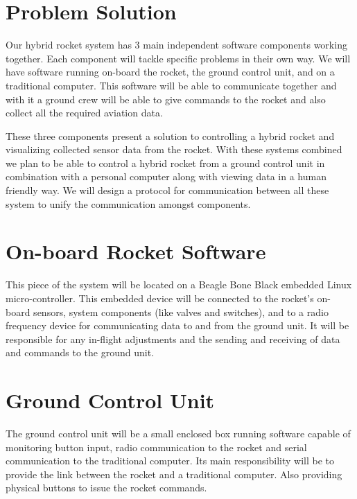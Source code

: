 \documentclass[12pt]{report}
\begin{document}
\section{Problem Solution}
\sectionfont{\scshape}
Our hybrid rocket system has 3 main independent software components working together. Each component will tackle specific problems in their own way. We will have software running on-board the rocket, the ground control unit, and on a traditional computer. This software will be able to communicate together and with it a ground crew will be able to give commands to the rocket and also collect all the required aviation data.\par
These three components present a solution to controlling a hybrid rocket and visualizing collected sensor data from the rocket. With these systems combined we plan to be able to control a hybrid rocket from a ground control unit in combination with a personal computer along with viewing data in a human friendly way. We will design a protocol for communication between all these system to unify the communication amongst components.

\section{On-board Rocket Software}
\sectionfont{\scshape}
This piece of the system will be located on a Beagle Bone Black embedded Linux micro-controller. This embedded device will be connected to the rocket's on-board sensors, system components (like valves and switches), and to a radio frequency device for communicating data to and from the ground unit. It will be responsible for any in-flight adjustments and the sending and receiving of data and commands to the ground unit.

\section{Ground Control Unit}
\sectionfont{\scshape}
The ground control unit will be a small enclosed box running software capable of monitoring button input, radio communication to the rocket and serial communication to the traditional computer. Its main responsibility will be to provide the link between the rocket and a traditional computer. Also providing physical buttons to issue the rocket commands. 
\end{document}
